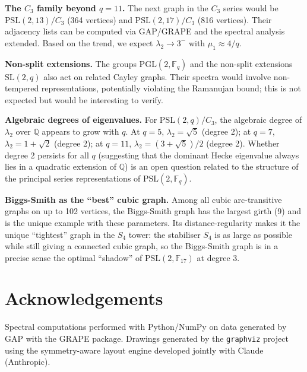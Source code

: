 \documentclass[11pt,a4paper]{amsart}
\theoremstyle{definition}
\theoremstyle{remark}
\newcommand{\PSL}[1]{\mathrm{PSL}(2,\mathbb{F}_{#1})}
\newcommand{\PGL}[1]{\mathrm{PGL}(2,\mathbb{F}_{#1})}
\newcommand{\Q}{\mathbb{Q}}
\begin{document}
\textbf{The $C_3$ family beyond $q=11$.}  The next graph in the $C_3$ series
would be $\mathrm{PSL}(2,13)/C_3$ (364 vertices) and
$\mathrm{PSL}(2,17)/C_3$ (816 vertices).  Their adjacency lists can be
computed via GAP/GRAPE and the spectral analysis extended.  Based on the
trend, we expect $\lambda_2 \to 3^-$ with $\mu_1 \approx 4/q$.

\textbf{Non-split extensions.}  The groups $\PGL{q}$ and the non-split
extensions $\mathrm{SL}(2,q)$ also act on related Cayley graphs.  Their
spectra would involve non-tempered representations, potentially violating the
Ramanujan bound; this is not expected but would be interesting to verify.

\textbf{Algebraic degrees of eigenvalues.}  For PSL$(2,q)/C_3$, the algebraic
degree of $\lambda_2$ over $\Q$ appears to grow with $q$.  At $q=5$,
$\lambda_2 = \sqrt{5}$ (degree 2); at $q=7$, $\lambda_2 = 1+\sqrt{2}$ (degree
2); at $q=11$, $\lambda_2 = (3+\sqrt{5})/2$ (degree 2).  Whether degree 2
persists for all $q$ (suggesting that the dominant Hecke eigenvalue always
lies in a quadratic extension of $\Q$) is an open question related to the
structure of the principal series representations of $\PSL{q}$.

\textbf{Biggs-Smith as the ``best'' cubic graph.}  Among all cubic
arc-transitive graphs on up to 102 vertices, the Biggs-Smith graph has the
largest girth (9) and is the unique example with these parameters.  Its
distance-regularity makes it the unique ``tightest'' graph in the $S_4$ tower:
the stabiliser $S_4$ is as large as possible while still giving a connected
cubic graph, so the Biggs-Smith graph is in a precise sense the optimal
``shadow'' of $\PSL{17}$ at degree 3.

\section*{Acknowledgements}

Spectral computations performed with Python/NumPy on data generated by GAP
with the GRAPE package.  Drawings generated by the \texttt{graphviz} project
using the symmetry-aware layout engine developed jointly with Claude (Anthropic).
\end{document}
